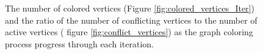 \begin{figure}
\centering
%
%
\caption{The number of colored vertices (Figure \ref{fig:colored_vertices_Iter}) and the ratio of the number of conflicting vertices to the number of active vertices ( figure \ref{fig:conflict_vertices}) as the graph coloring process progress through each iteration. }
\label{fig:colored_vertices}%
\end{figure}



